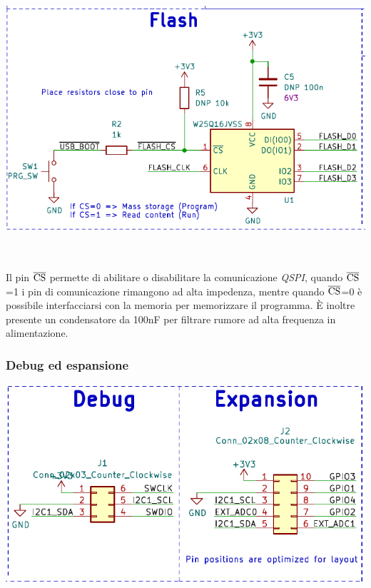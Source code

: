 \begin{center}
\includegraphics[width=6.5in,height=4.05556in]{figures/image49.png}
\captionsetup{type=figure}
\end{center}

Il pin $\overline{\rm {CS}}$ permette di abilitare o
disabilitare la comunicazione \emph{QSPI}, quando $\overline{\rm {CS}}$=1 i pin di
comunicazione rimangono ad alta impedenza, mentre quando $\overline{\rm {CS}}$=0 è
possibile interfacciarsi con la memoria per memorizzare il programma. È
inoltre presente un condensatore da 100nF per filtrare rumore ad alta
frequenza in alimentazione.

\hypertarget{debug-ed-espansione}{%
\subsubsection{\texorpdfstring{\hfill\break
Debug ed espansione}{ Debug ed espansione}}\label{debug-ed-espansione}}

\begin{center}
\includegraphics[scale=0.8]{figures/image90.png}
\captionsetup{type=figure}
\end{center}

